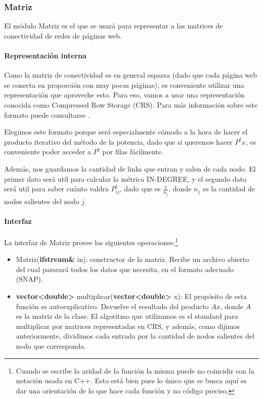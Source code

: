 \subsubsection{Matriz}
El módulo Matriz es el que se usará para representar a las matrices de conectividad de redes de páginas web.
\paragraph{Representación interna}

Como la matriz de conectividad es en general esparsa (dado que cada página web se conecta en proporción con muy pocas páginas), es conveniente utilizar una representación que aproveche esto. Para eso, vamos a usar una representación conocida como Compressed Row Storage (CRS). Para más información sobre este formato puede consultarse \cite{CRS}.

Elegimos este formato porque será especialmente cómodo a la hora de hacer el producto iterativo del método de la potencia, dado que si queremos hacer $P^tx$, es conveniente poder acceder a $P^t$ por filas fácilmente. 

Además, nos guardamos la cantidad de links que entran y salen de cada nodo. El primer dato será util para calcular la métrica IN-DEGREE, y el segundo dato será util para saber cuánto valdra $P^t_{ij}$, dado que es $\frac{1}{n_j}$, donde $n_j$ es la cantidad de nodos salientes del nodo $j$.

\paragraph{Interfaz}
La interfaz de Matriz provee las siguientes operaciones:\footnote{Cuando se escribe la aridad de la función la misma puede no coincidir con la notación usada en C++. Esto está bien pues lo único que se busca aquí es dar una orientación de lo que hace cada función y no código preciso.}

\begin{itemize}
    \item Matriz(\textbf{ifstream\&} in): constructor de la matriz. Recibe un archivo abierto del cual parseará todos los datos que necesita, en el formato adecuado (SNAP).

    \item \textbf{vector<double>} multiplicar(\textbf{vector<double>} x): El propósito de esta función es autoexplicativo. Devuelve el resultado del producto $Ax$, donde $A$ es la matriz de la clase. El algoritmo que utilizamos es el standard para multiplicar por matrices representadas en CRS, y además, como dijimos anteriormente, dividimos cada entrada por la cantidad de nodos salientes del nodo que corresponda.
\end{itemize}

